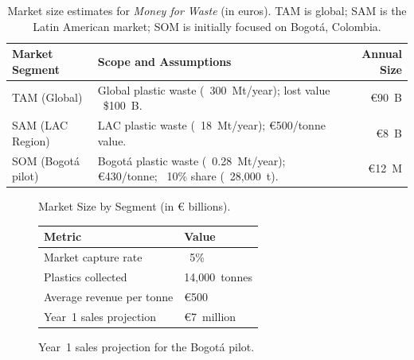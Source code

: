 \begin{table}[h!]\centering
    \caption{Market size estimates for \textit{Money for Waste} (in euros). TAM is global; SAM is the Latin American market; SOM is initially focused on Bogotá, Colombia.\label{tab:markets}}
    \begin{tabular}{p{4.7cm}p{5.5cm}r}
    \hline 
    \textbf{Market Segment} & \textbf{Scope and Assumptions} & \textbf{Annual Size}\\ 
    \hline 
    TAM (Global) & Global plastic waste (~300~Mt/year); lost value ~\$100~B. & ~€90~B \\ 
    SAM (LAC Region) & LAC plastic waste (~18~Mt/year); €500/tonne value. & ~€8~B \\ 
    SOM (Bogotá pilot) & Bogotá plastic waste (~0.28~Mt/year); €430/tonne; ~10\% share (~28,000~t). & ~€12~M \\ 
    \hline
    \end{tabular}
    \end{table}
\begin{figure}[h!]
    \centering
    \caption{Market Size by Segment (in € billions).}
  \end{figure}

  \begin{figure}[h!]
    \centering
    \begin{tabular}{|l|l|}
        \hline
        \textbf{Metric} & \textbf{Value} \\ \hline
        Market capture rate & ~5\% \\ \hline
        Plastics collected & 14,000~tonnes \\ \hline
        Average revenue per tonne & €500 \\ \hline
        Year 1 sales projection & €7~million \\ \hline
    \end{tabular}
    \caption{Year 1 sales projection for the Bogotá pilot.}
    \label{fig:year1_sales_projection}
\end{figure}
  